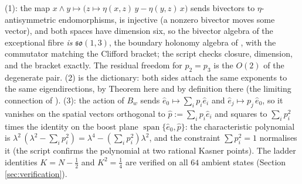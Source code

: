 (1): the map $x \wedge y \mapsto \bigl(z \mapsto \eta(x,z)\,y - \eta(y,z)\,x\bigr)$ sends bivectors to $\eta$-antisymmetric endomorphisms, is injective (a nonzero bivector moves some vector), and both spaces have dimension six, so the bivector algebra of the exceptional fibre \emph{is} $\mathfrak{so}(1,3)$, the boundary holonomy algebra of , with the commutator matching the Clifford bracket; the script checks closure, dimension, and the bracket exactly. The residual freedom for $p_2 = p_3$ is the $O(2)$ of the degenerate pair. (2) is the dictionary: both sides attach the same exponents to the same eigendirections, by Theorem  here and by definition there (the limiting connection of ). (3): the action of $B_w$ sends $\hat e_0 \mapsto \sum_i p_i \hat e_i$ and $\hat e_j \mapsto p_j\, \hat e_0$, so it vanishes on the spatial vectors orthogonal to $\hat p := \sum_i p_i \hat e_i$ and squares to $\sum_i p_i^2$ times the identity on the boost plane $\operatorname{span}\{\hat e_0, \hat p\}$: the characteristic polynomial is $\lambda^2\,(\lambda^2 - \sum_i p_i^2) = \lambda^4 - (\sum_i p_i^2)\lambda^2$, and the constraint $\sum p_i^2 = 1$ normalises it (the script confirms the polynomial at two rational Kasner points). The ladder identities $K = N - \tfrac12$ and $K^2 = \tfrac14$ are verified on all $64$ ambient states (Section \ref{sec:verification}).
